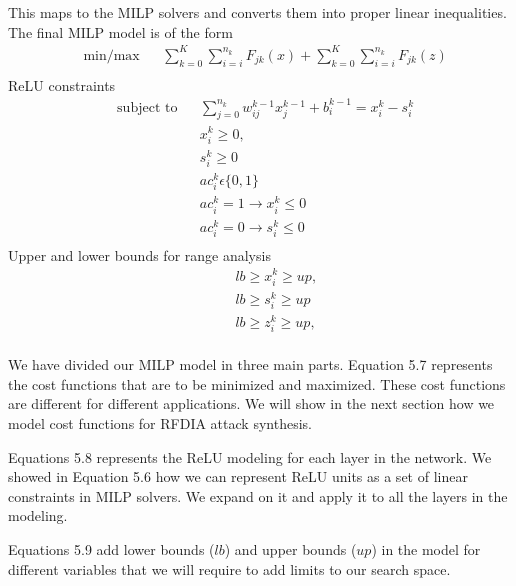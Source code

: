This maps to the \ac{MILP} solvers and converts them into proper linear inequalities. 
The final \ac{MILP} model is of the form
\begin{equation}
\begin{aligned}
& \underset{}{\text{min/max}}
& &  \sum_{k=0}^{K} \sum_{i=i}^{n_k}F_{jk}(x)   + \sum_{k=0}^{K} \sum_{i=i}^{n_k}F_{jk}(z)  \\
\end{aligned}
\end{equation}
ReLU constraints
\begin{equation}
\begin{aligned}
& \text{subject to} & &  \sum_{j=0}^{n_k} w_{ij}^{k-1}x_{j}^{k-1} + b_i^{k-1} = x_i^k - s_i^k  \\
& & & x_i^k \geq 0, \\
& & & s_i^k \geq 0 \\
& & & ac_i^k  \epsilon  \{0,1\} \\
& & & ac_i^k  =  1 \rightarrow  x_i^k \leq 0  \\
& & & ac_i^k =  0 \rightarrow s_i^k  \leq 0   \\
\end{aligned}
\end{equation}
Upper and lower bounds for range analysis
\begin{equation}
\begin{aligned}
& & & lb \geq x_i^k \geq up, \\
& & &  lb \geq s_i^k \geq up \\
& & & lb \geq z_i^k \geq up, \\
\end{aligned}
\end{equation}

We have divided our \ac{MILP} model in three main parts. 
Equation 5.7 represents the cost functions that are to be minimized and maximized.
These cost functions are different for different applications.  
We will show in the next section how we model cost functions for \ac{RFDIA}
attack synthesis. 

Equations 5.8 represents the ReLU modeling for each layer in the network. 
We showed in Equation 5.6 how we can represent ReLU units as a set of linear constraints in \ac{MILP} solvers. 
We expand on it and apply it to all the layers in the modeling. 

Equations 5.9 add lower bounds ($lb$) and upper bounds ($up$) in the  model for different variables that we will  require to add limits to our search space.  











